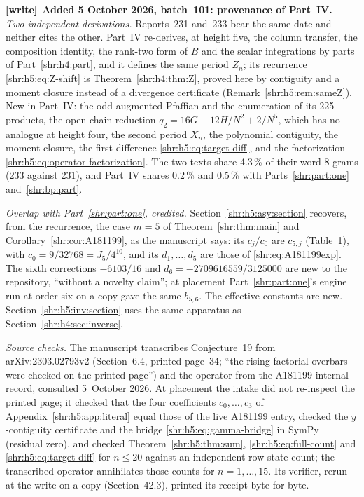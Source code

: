 \documentclass[11pt,letterpaper]{article}
\numberwithin{equation}{section}
\theoremstyle{definition}
\newcommand{\1}{\mathbf 1}
\newenvironment{writenote}[1][]{\par\smallskip\begingroup\small
 \noindent\textbf{[write]}\if\relax\detokenize{#1}\relax\else~\textbf{#1.}\fi\ }%
 {\par\endgroup\smallskip}
\begin{document}
\begin{writenote}[Added 5 October 2026, batch~101: provenance of Part~IV]
\emph{Two independent derivations.} Reports~231 and~233 bear the same date
and neither cites the other. Part~IV re-derives, at height five, the
column transfer, the composition identity, the rank-two form of $B$ and the
scalar integrations by parts of Part~\ref{shr:h4:part}, and it defines the
same period $Z_n$; its recurrence \eqref{shr:h5:eq:Z-shift} is
Theorem~\ref{shr:h4:thm:Z}, proved here by contiguity and a moment closure
instead of a divergence certificate (Remark~\ref{shr:h5:rem:sameZ}). New
in Part~IV: the odd augmented Pfaffian and the enumeration of its 225
products, the open-chain reduction $q_2=16G-12H/N^2+2/N^5$, which has no
analogue at height four, the second period $X_n$, the polynomial
contiguity, the moment closure, the first difference
\eqref{shr:h5:eq:target-diff}, and the factorization
\eqref{shr:h5:eq:operator-factorization}. The two texts share 4.3\,\% of
their word 8-grams (233 against 231), and Part~IV shares 0.2\,\% and
0.5\,\% with Parts~\ref{shr:part:one} and~\ref{shr:bp:part}.

\emph{Overlap with Part~\ref{shr:part:one}, credited.}
Section~\ref{shr:h5:asy:section} recovers, from the recurrence, the case
$m=5$ of Theorem~\ref{shr:thm:main} and
Corollary~\ref{shr:cor:A181199}, as the manuscript says: its
$c_j/c_0$ are $c_{5,j}$ (Table~1), with $c_0=9/32768=J_5/4^{10}$, and
its $d_1,\ldots,d_5$ are those of \eqref{shr:eq:A181199exp}. The sixth
corrections $-6103/16$ and $d_6=-2709616559/3125000$ are new to the
repository, ``without a novelty claim''; at placement
Part~\ref{shr:part:one}'s engine run at order six on a copy gave the same
$b_{5,6}$. The effective constants are new. Section~\ref{shr:h5:inv:section}
uses the same apparatus as Section~\ref{shr:h4:sec:inverse}.

\emph{Source checks.} The manuscript transcribes Conjecture~19 from
arXiv:2303.02793v2 (Section~6.4, printed page~34; ``the rising-factorial
overbars were checked on the printed page'') and the operator from the
A181199 internal record, consulted 5~October 2026. At placement the intake
did not re-inspect the printed page; it checked that the four coefficients
$c_0,\ldots,c_3$ of Appendix~\ref{shr:h5:app:literal} equal those of the
live A181199 entry, checked the $y$-contiguity certificate and the bridge
\eqref{shr:h5:eq:gamma-bridge} in SymPy (residual zero), and checked
Theorem~\ref{shr:h5:thm:sum}, \eqref{shr:h5:eq:full-count} and
\eqref{shr:h5:eq:target-diff} for $n\le20$ against an independent row-state
count; the transcribed operator annihilates those counts for
$n=1,\ldots,15$. Its verifier, rerun at the write on a copy
(Section~42.3), printed its receipt byte for byte.


\end{writenote}
\end{document}
